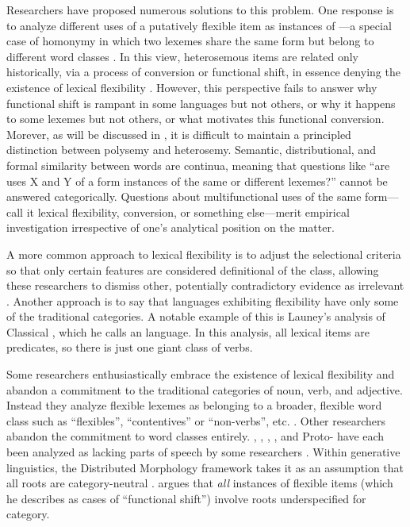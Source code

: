 Researchers have proposed numerous solutions to this problem. One response is to analyze different uses of a putatively flexible item as instances of —a special case of homonymy in which two lexemes share the same form but belong to different word classes \parencite{Lichtenberk1991}. In this view, heterosemous items are related only historically, via a process of conversion or functional shift, in essence denying the existence of lexical flexibility \parencite{EvansOsada2005}. However, this perspective fails to answer why functional shift is rampant in some languages but not others, or why it happens to some lexemes but not others, or what motivates this functional conversion. Morever, as will be discussed in , it is difficult to maintain a principled distinction between polysemy and heterosemy. Semantic, distributional, and formal similarity between words are continua, meaning that questions like \enquote{are uses X and Y of a form instances of the same or different lexemes?} cannot be answered categorically. Questions about multifunctional uses of the same form—call it lexical flexibility, conversion, or something else—merit empirical investigation irrespective of one's analytical position on the matter.

A more common approach to lexical flexibility is to adjust the selectional criteria so that only certain features are considered definitional of the class, allowing these researchers to dismiss other, potentially contradictory evidence as irrelevant . Another approach is to say that languages exhibiting flexibility have only some of the traditional categories. A notable example of this is Launey's \parencites*{Launey1994}{Launey2004} analysis of Classical , which he calls an  language. In this analysis, all lexical items are predicates, so there is just one giant class of verbs.

Some researchers enthusiastically embrace the existence of lexical flexibility and abandon a commitment to the traditional categories of noun, verb, and adjective. Instead they analyze flexible lexemes as belonging to a broader, flexible word class such as \enquote{flexibles}, \enquote{contentives} or \enquote{non-verbs}, etc. \parencites{HengeveldRijkhoff2005}{Luuk2010}. Other researchers abandon the commitment to word classes entirely. , , , , and Proto- have each been analyzed as lacking parts of speech by some researchers . Within generative linguistics, the Distributed Morphology framework takes it as an assumption that all roots are category-neutral \parencite{Siddiqi2018}. \textcite{Farrell2001} argues that \emph{all} instances of flexible items (which he describes as cases of \enquote{functional shift}) involve roots underspecified for category.

